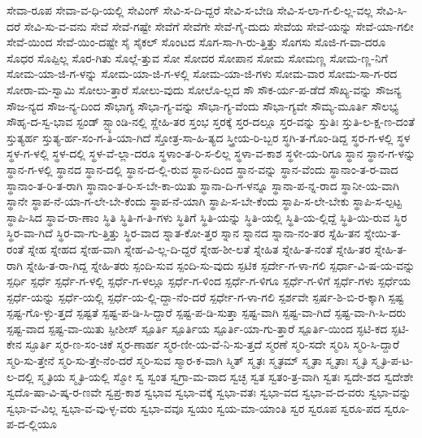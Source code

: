 {ಸೇವಾ-ರೂಪ
ಸೇವಾ-ವ-ಧಿ-ಯಲ್ಲಿ
ಸೇವಿಂಗ್
ಸೇವಿ-ಸ-ದಿ-ದ್ದರೆ
ಸೇವಿ-ಸ-ಬೇಡಿ
ಸೇವಿ-ಸ-ಲಾ-ಗ-ಲಿ-ಲ್ಲ-ವಲ್ಲ
ಸೇವಿ-ಸಿ-ದರೆ
ಸೇವಿ-ಸು-ವ-ವನು
ಸೇವೆ
ಸೇವೆ-ಗಷ್ಟೇ
ಸೇವೆಗೆ
ಸೇವೆಗೇ
ಸೇವೆ-ಗೈ-ದುದು
ಸೇವೆಯ
ಸೇವೆ-ಯನ್ನು
ಸೇವೆ-ಯಾ-ಗಲೀ
ಸೇವೆ-ಯಿಂದ
ಸೇವೆ-ಯಿಂ-ದಷ್ಟೇ
ಸೈ
ಸೈಕಲ್
ಸೊಂಟದ
ಸೊಗ-ಸಾ-ಗಿ-ರು-ತ್ತಿತ್ತು
ಸೊಗಸು
ಸೊಜಿ-ಗ-ವಾ-ದರೂ
ಸೊಧರ
ಸೊಪ್ಪಿಲ್ಲ
ಸೊರ-ಗಿತು
ಸೊಲ್ಲೆ-ತ್ತುವ
ಸೋ
ಸೋದರ
ಸೋಪಾನ
ಸೋಮ
ಸೋಮಣ್ಣ
ಸೋಮ-ಣ್ಣ-ನಿಗೆ
ಸೋಮ-ಯಾ-ಜಿ-ಗ-ಳನ್ನು
ಸೋಮ-ಯಾ-ಜಿ-ಗ-ಳಲ್ಲಿ
ಸೋಮ-ಯಾ-ಜಿ-ಗಳು
ಸೋಮ-ವಾರ
ಸೋಮ-ಸಾ-ಗ-ರದ
ಸೋರಾ-ಮ-ಸ್ವಾಮಿ
ಸೋಲು-ತ್ತಾರೆ
ಸೋಲು-ವುದು
ಸೋಲೊ-ಲ್ಲದ
ಸೌ
ಸೌಕ-ರ್ಯ-ಪ-ಡೆದೆ
ಸೌಖ್ಯ-ವನ್ನು
ಸೌಜನ್ಯ
ಸೌಜ-ನ್ಯದ
ಸೌಜ-ನ್ಯ-ದಿಂದ
ಸೌಭಾಗ್ಯ
ಸೌಭಾ-ಗ್ಯ-ವನ್ನು
ಸೌಭಾ-ಗ್ಯ-ವೆಂದು
ಸೌಭಾ-ಗ್ಯವೇ
ಸೌಮ್ಯ-ಮೂರ್ತಿ
ಸೌಲಭ್ಯ
ಸೌಹೃ-ದ-ಸ್ವ-ಭಾವ
ಸ್ಟಂಡ್
ಸ್ಟ್ಯಾಂಡಿ-ನಲ್ಲಿ
ಸ್ಣೇಹಿ-ತರ
ಸ್ತಂಭ
ಸ್ತರಕ್ಕೆ
ಸ್ತರ-ದಲ್ಲೂ
ಸ್ತರ-ವನ್ನು
ಸ್ತುತಿಃ
ಸ್ತುತಿ-ಲ-ಕ್ಷ-ಣ-ದಂತೆ
ಸ್ತುತ್ಯರ್ಹ
ಸ್ತುತ್ಯ-ರ್ಹ-ಸಂ-ಗ-ತಿ-ಯಾ-ಗಿದೆ
ಸ್ತೋತ್ರ-ಸಾ-ಹಿ-ತ್ಯದ
ಸ್ತ್ರೀಯ-ರಿ-ಬ್ಬರ
ಸ್ಥಗಿ-ತ-ಗೊಂ-ಡಿದ್ದ
ಸ್ಥರ-ಗ-ಳಲ್ಲಿ
ಸ್ಥಳ
ಸ್ಥಳ-ಗ-ಳಲ್ಲಿ
ಸ್ಥಳ-ದಲ್ಲಿ
ಸ್ಥಳ-ವೆ-ಲ್ಲಾ-ದರೂ
ಸ್ಥಳಾಂ-ತ-ರಿ-ಸ-ಲಿಲ್ಲ
ಸ್ಥಳಾ-ವ-ಕಾಶ
ಸ್ಥಳೀ-ಯ-ರಿಗೂ
ಸ್ಥಾನ
ಸ್ಥಾನ-ಗ-ಳನ್ನು
ಸ್ಥಾನ-ಗ-ಳಲ್ಲಿ
ಸ್ಥಾನದ
ಸ್ಥಾನ-ದಲ್ಲಿ
ಸ್ಥಾನ-ದ-ಲ್ಲಿ-ರುವ
ಸ್ಥಾನ-ದಿಂದ
ಸ್ಥಾನ-ವನ್ನು
ಸ್ಥಾನ-ವೆಂದು
ಸ್ಥಾನಾಂ-ತ-ರ-ವಾದ
ಸ್ಥಾನಾಂ-ತ-ರಿ-ತ-ರಾಗಿ
ಸ್ಥಾನಾಂ-ತ-ರಿ-ಸ-ಬೇ-ಕಾ-ಯಿತು
ಸ್ಥಾನಾ-ದಿ-ಗ-ಳನ್ನೂ
ಸ್ಥಾನಾ-ಪ-ನ್ನ-ರಾದ
ಸ್ಥಾನೀ-ಯ-ವಾಗಿ
ಸ್ಥಾನೇ
ಸ್ಥಾಪ-ನೆ-ಯಾ-ಗ-ಲೇ-ಬೇ-ಕೆಂದು
ಸ್ಥಾಪ-ನೆ-ಯಾಗಿ
ಸ್ಥಾಪಿ-ಸ-ಬೇ-ಕೆಂದು
ಸ್ಥಾಪಿ-ಸ-ಲೇ-ಬೇಕು
ಸ್ಥಾಪಿ-ಸ-ಲ್ಪಟ್ಟ
ಸ್ಥಾಪಿ-ಸಿದ
ಸ್ಥಾವ-ರಾ-ಣಾಂ
ಸ್ಥಿತಿ
ಸ್ಥಿತಿ-ಗ-ತಿ-ಗಳು
ಸ್ಥಿತಿಗೆ
ಸ್ಥಿತಿ-ಯನ್ನು
ಸ್ಥಿತಿ-ಯಲ್ಲಿ
ಸ್ಥಿತಿ-ಯ-ಲ್ಲಿದ್ದೆ
ಸ್ಥಿತಿ-ಯಿ-ರುವ
ಸ್ಥಿರ
ಸ್ಥಿರ-ವಾ-ಗಿದೆ
ಸ್ಥಿರ-ವಾ-ಗು-ತ್ತಿತ್ತು
ಸ್ಥಿರ-ವಾದ
ಸ್ನಾತ-ಕೋ-ತ್ತರ
ಸ್ನಾನ
ಸ್ನಾನದ
ಸ್ನಾನಾ-ನಂ-ತರ
ಸ್ನೆಹಿ-ತನ
ಸ್ನೇಯಿ-ತ-ರಂತೆ
ಸ್ನೇಹ
ಸ್ನೇಹದ
ಸ್ನೇಹ-ವಾಗಿ
ಸ್ನೇಹ-ವಿ-ಲ್ಲ-ದಿ-ದ್ದರೆ
ಸ್ನೇಹ-ಶೀ-ಲತೆ
ಸ್ನೇಹಿತ
ಸ್ನೇಹಿ-ತ-ನಂತೆ
ಸ್ನೇಹಿ-ತರ
ಸ್ನೇಹಿ-ತ-ರಾಗಿ
ಸ್ನೇಹಿ-ತ-ರಾ-ಗಿದ್ದ
ಸ್ನೇಹಿ-ತರು
ಸ್ಪಂದಿ-ಸುವ
ಸ್ಪಂದಿ-ಸು-ವುದು
ಸ್ಪಟಿಕ
ಸ್ಪರ್ದೇ-ಗ-ಳಾ-ಗಲಿ
ಸ್ಪರ್ಧಾ-ವಿ-ಷ-ಯ-ವನ್ನು
ಸ್ಪರ್ಧಿ
ಸ್ಪರ್ಧೆ
ಸ್ಪರ್ಧೆ-ಗ-ಳಲ್ಲಿ
ಸ್ಪರ್ಧೆ-ಗ-ಳಲ್ಲೂ
ಸ್ಪರ್ಧೆ-ಗ-ಳಿಂದ
ಸ್ಪರ್ಧೆ-ಗ-ಳಿಗೂ
ಸ್ಪರ್ಧೆ-ಗ-ಳಿಗೆ
ಸ್ಪರ್ಧೆ-ಗಳು
ಸ್ಪರ್ಧೆಯ
ಸ್ಪರ್ಧೆ-ಯನ್ನು
ಸ್ಪರ್ಧೆ-ಯಲ್ಲಿ
ಸ್ಪರ್ಧೆ-ಯ-ಲ್ಲಿ-ದ್ದಾ-ನೆಂ-ದರೆ
ಸ್ಪರ್ಧೇ-ಗ-ಳಾ-ಗಲಿ
ಸ್ಪರ್ಶವೇ
ಸ್ಪರ್ಷ-ಶಿ-ಬಿ-ರ-ಕ್ಕಾಗಿ
ಸ್ಪಷ್ಟ
ಸ್ಪಷ್ಟ-ಗೊ-ಳ್ಳು-ತ್ತದೆ
ಸ್ಪಷ್ಟತೆ
ಸ್ಪಷ್ಟ-ಪ-ಡಿ-ಸಿ-ದ್ದಾರೆ
ಸ್ಪಷ್ಟ-ಪ-ಡಿ-ಸುತ್ತಾ
ಸ್ಪಷ್ಟ-ವಾಗಿ
ಸ್ಪಷ್ಟ-ವಾ-ಗಿದೆ
ಸ್ಪಷ್ಟ-ವಾ-ಗಿ-ಸಿ-ದರು
ಸ್ಪಷ್ಟ-ವಾದ
ಸ್ಪಷ್ಟ-ವಾ-ಯಿತು
ಸ್ಪೀಶೀಸ್
ಸ್ಪೂರ್ತಿ
ಸ್ಪೂರ್ತಿಯ
ಸ್ಪೂರ್ತಿ-ಯಾ-ಗು-ತ್ತಾರೆ
ಸ್ಪೂರ್ತಿ-ಯಿಂದ
ಸ್ಫಟಿ-ಕದ
ಸ್ಫಟಿ-ಕೇನ
ಸ್ಫೂರ್ತಿ
ಸ್ಮರ-ಣ-ಸಂ-ಚಿಕೆ
ಸ್ಮರ-ಣಾರ್ಹ
ಸ್ಮರ-ಣೀ-ಯ-ವೆ-ನಿ-ಸು-ತ್ತದೆ
ಸ್ಮರಣೆ
ಸ್ಮರಿ-ಸದೇ
ಸ್ಮರಿಸಿ
ಸ್ಮರಿ-ಸಿ-ದ್ದಾರೆ
ಸ್ಮರಿ-ಸು-ತ್ತೇನೆ
ಸ್ಮರಿ-ಸು-ತ್ತೇ-ನೆಂ-ದರೆ
ಸ್ಮರಿ-ಸುವ
ಸ್ಮಾರ-ಕ-ವಾಗಿ
ಸ್ಮಿತ್
ಸ್ಮೃತಃ
ಸ್ಮೃತಮ್
ಸ್ಮೃತಾ
ಸ್ಮೃತಾಃ
ಸ್ಮೃತಿ
ಸ್ಮೃತಿ-ಪ-ಟ-ಲ-ದಲ್ಲಿ
ಸ್ಮೃತಿಯ
ಸ್ಮೃತಿ-ಯಲ್ಲಿ
ಸ್ಮೋ
ಸ್ವ
ಸ್ವಂತ
ಸ್ವಗ್ರಾ-ಮ-ವಾದ
ಸ್ವಚ್ಛ
ಸ್ವತ
ಸ್ವತಂ-ತ್ರ-ವಾಗಿ
ಸ್ವತಃ
ಸ್ವದೇ-ಶದ
ಸ್ವದೇಶೇ
ಸ್ವದೊ-ಷಾ-ವಿ-ಷ್ಕ-ರ-ಣವೇ
ಸ್ವಪ್ರ-ಕಾಶ
ಸ್ವಭಾವ
ಸ್ವಭಾ-ವಕ್ಕೆ
ಸ್ವಭಾ-ವತಃ
ಸ್ವಭಾ-ವದ
ಸ್ವಭಾ-ವ-ದ-ವರು
ಸ್ವಭಾ-ವನ್ನು
ಸ್ವಭಾ-ವ-ವಿಲ್ಲ
ಸ್ವಭಾ-ವ-ವು-ಳ್ಳ-ವರು
ಸ್ವಭಾ-ವವೂ
ಸ್ವಯಂ
ಸ್ವಯ-ಮಾ-ಯಾಂತಿ
ಸ್ವರ
ಸ್ವರೂಪ
ಸ್ವರೂ-ಪದ
ಸ್ವರೂ-ಪ-ದ-ಲ್ಲಿಯೂ
}
